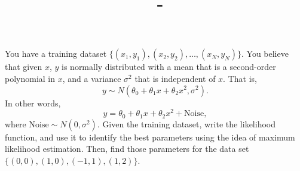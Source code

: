 \documentclass[answers,12pt,addpoints]{exam}
\author{\name}
\title{\course \ - \assignment}
\begin{document}
\maketitle

\begin{questions}
\question You have a training dataset \(\{(x_1, y_1), (x_2, y_2), \ldots, (x_N, y_N)\}\). You believe that given \(x\), \(y\) is normally distributed with a mean that is a second-order polynomial in \(x\), and a variance \(\sigma^2\) that is independent of \(x\). That is, 
\[ y \sim N (\theta_0 + \theta_1x + \theta_2x^2, \sigma^2). \]
In other words, 
\[ y = \theta_0 + \theta_1x + \theta_2x^2 + \text{Noise}, \]
where \(\text{Noise} \sim N (0, \sigma^2)\). Given the training dataset, write the likelihood function, and use it to identify the best parameters using the idea of maximum likelihood estimation. Then, find those parameters for the data set \(\{(0, 0), (1, 0), (-1, 1), (1, 2)\}\).


\end{questions}
\end{document}
